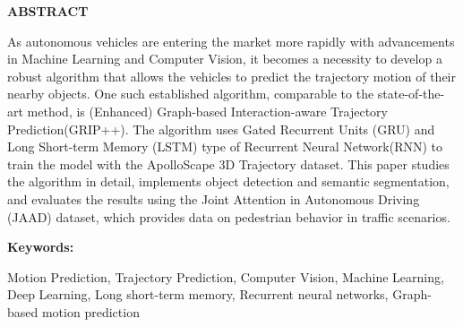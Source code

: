 \vspace{0.5pt}
\begin{flushleft}
    \setlength{\parskip}{0pt}
    {\raggedright{{\Large{\bf{ABSTRACT}}}} \par}
    \bigskip
    \vspace{6pt}
    

\end{flushleft} %

As autonomous vehicles are entering the market more rapidly with advancements in Machine Learning and Computer Vision, it becomes a necessity to develop a robust algorithm that allows the vehicles to predict the trajectory motion of their nearby objects. One such established algorithm, comparable to the state-of-the-art method, is (Enhanced) Graph-based Interaction-aware Trajectory Prediction(GRIP++). The algorithm uses Gated Recurrent Units (GRU) and Long Short-term Memory (LSTM) type of Recurrent Neural Network(RNN) to train the model with the ApolloScape 3D Trajectory dataset. This paper studies the algorithm in detail, implements object detection and semantic segmentation, and evaluates the results using the Joint Attention in Autonomous Driving (JAAD) dataset, which provides data on pedestrian behavior in traffic scenarios.

\vspace{3cm} %

\raggedright{{\large \textbf{Keywords: }}}\par{\large Motion Prediction, Trajectory Prediction, Computer Vision, Machine Learning, Deep Learning, Long short-term memory, Recurrent neural networks, Graph-based motion prediction}
\vfill
\clearpage
